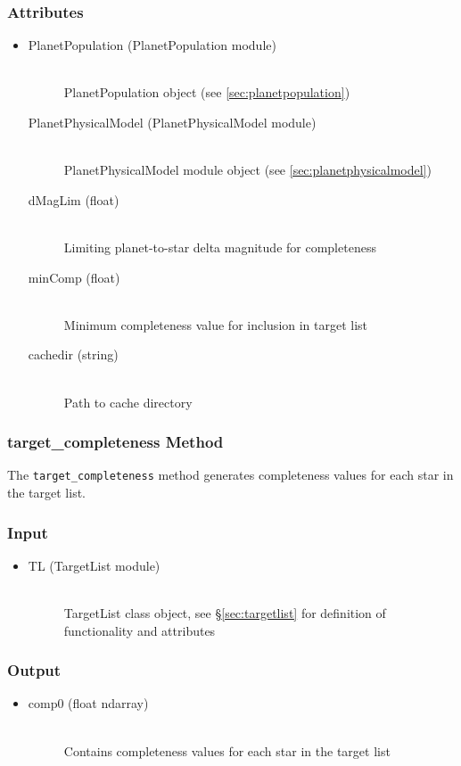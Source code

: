 \documentclass[cleanfoot]{asme2ej}
\begin{document}
\subsubsection*{Attributes}
\begin{itemize}
\item 
\begin{description}
    \item[PlanetPopulation (PlanetPopulation module)] \hfill \\ PlanetPopulation object (see \ref{sec:planetpopulation})
    \item[PlanetPhysicalModel (PlanetPhysicalModel module)] \hfill \\ PlanetPhysicalModel module object (see \ref{sec:planetphysicalmodel}) 
    \item[dMagLim (float)] \hfill \\ Limiting planet-to-star delta magnitude for completeness
    \item[minComp (float)] \hfill \\ Minimum completeness value for inclusion in target list
    \item[cachedir (string)] \hfill \\ Path to cache directory
\end{description}
\end{itemize}

\subsubsection{target\_completeness Method}
\label{sec:targetcompletenesstask}
The \verb+target_completeness+ method generates completeness values for each star in the target list.
\subsubsection*{Input}
\begin{itemize}
\item 
\begin{description}
    \item[TL (TargetList module)] \hfill \\ TargetList class object, see \S\ref{sec:targetlist} for definition of functionality and attributes
\end{description}
\end{itemize}
\subsubsection*{Output}
\begin{itemize}
\item 
\begin{description}
    \item[comp0 (float ndarray)] \hfill \\ Contains completeness values for each star in the target list
\end{description}
\end{itemize}
\end{document}
